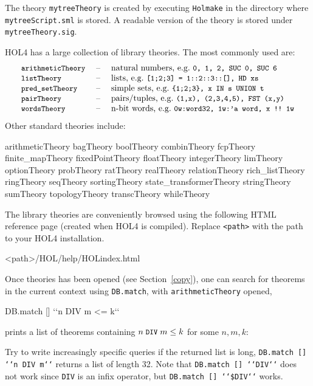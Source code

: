 \documentclass[a4paper,10pt]{article}
\begin{document}
The theory {\tt mytreeTheory} is created by executing {\tt Holmake} in
the directory where {\tt mytreeScript.sml} is stored. A
readable version of the theory is stored under {\tt mytreeTheory.sig}.

\newpage


\newcommand{\itemx}[2]{\texttt{\small #1} &\;\textrm{--}\;& \textrm{#2} \\}

HOL4 has a large collection of library theories. The most commonly used are:
\begin{displaymath}
\begin{array}{lcl}
\itemx{arithmeticTheory}{natural numbers, \eg{} {\tt\small 0, 1, 2, SUC 0, SUC 6}}
\itemx{listTheory}{lists, \eg{} {\tt\small [1;2;3] = 1::2::3::[], HD xs}}
\itemx{pred\_setTheory}{simple sets,\ \eg{} {\tt\small \{1;2;3\}, x IN s UNION t}}
\itemx{pairTheory}{pairs/tuples,\ \eg{} {\tt\small (1,x), (2,3,4,5), FST (x,y)}}
\itemx{wordsTheory}{n-bit words,\ \eg{} {\tt\small 0w:word32, 1w:'a word, x {!!}~1w}}
\end{array}
\end{displaymath}
Other standard theories include:
\begin{code}
arithmeticTheory  bagTheory  boolTheory  combinTheory  fcpTheory
finite_mapTheory  fixedPointTheory  floatTheory  integerTheory
limTheory  optionTheory  probTheory  ratTheory  realTheory
relationTheory  rich_listTheory  ringTheory  seqTheory
sortingTheory  state_transformerTheory  stringTheory  sumTheory
topologyTheory  transcTheory  whileTheory
\end{code}
The library theories are conveniently browsed using the following HTML reference page (created when HOL4 is compiled).
Replace {\tt <path>} with the path to your HOL4 installation.
\begin{code}
<path>/HOL/help/HOLindex.html
\end{code}

Once theories has been opened (see Section~\ref{copy}), one can search for theorems in the current
context using {\tt DB.match}, \eg{} with {\tt arithmeticTheory} opened,
\begin{code}
DB.match [] {`}`n DIV m <= k{`}`
\end{code}
prints a list of theorems containing $n\; \texttt{\small DIV} \;m \leq k$ for some $n,m,k$:
\begin{code}
[(("arithmetic", "DIV_LE_MONOTONE"),
  (|- !n x y. 0 < n \conj{} x <= y ==> x DIV n <= y DIV n, Thm)),
 (("arithmetic", "DIV_LE_X"),
  (|- !x y z. 0 < z ==> (y DIV z <= x = y < (x + 1) * z), Thm)),
 (("arithmetic", "DIV_LESS_EQ"),
  (|- !n. 0 < n ==> !k. k DIV n <= k, Thm))]
\end{code}
Try to write increasingly specific queries if the returned list is long, \eg{}
{\tt\small DB.match [] {`}`n DIV m{`}`} returns a list of length 32. Note that {\tt\small DB.match [] {`}`DIV{`}`}
does not work since {\tt\small DIV} is an infix operator, but {\tt\small DB.match [] {`}`\$DIV{`}`} works.
\end{document}
